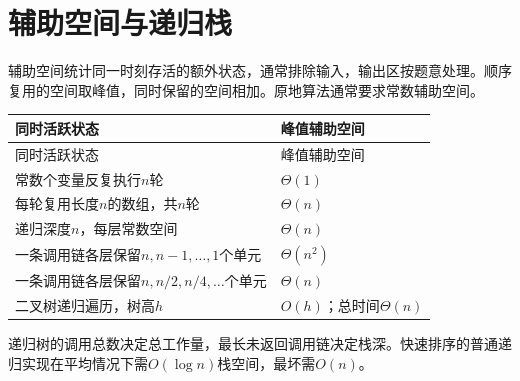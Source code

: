 \section{辅助空间与递归栈}\label{DS01-space}

辅助空间统计同一时刻存活的额外状态，通常排除输入，输出区按题意处理。顺序复用的空间取峰值，同时保留的空间相加。原地算法通常要求常数辅助空间。

\par\smallskip
{\fontsize{9.3}{12}\selectfont\setlength{\tabcolsep}{2.5pt}\setlength{\LTleft}{0pt}\setlength{\LTright}{0pt}
\begin{longtable}{@{}>{\raggedright\arraybackslash}p{}>{\raggedright\arraybackslash}p{}@{}}
\toprule
同时活跃状态 & 峰值辅助空间 \\

\midrule\endfirsthead\toprule
同时活跃状态 & 峰值辅助空间 \\

\midrule\endhead\bottomrule\endfoot
常数个变量反复执行\(n\)轮 & \(\Theta(1)\) \\

每轮复用长度\(n\)的数组，共\(n\)轮 & \(\Theta(n)\) \\

递归深度\(n\)，每层常数空间 & \(\Theta(n)\) \\

一条调用链各层保留\(n,n-1,\ldots,1\)个单元 & \(\Theta(n^2)\) \\

一条调用链各层保留\(n,n/2,n/4,\ldots\)个单元 & \(\Theta(n)\) \\

二叉树递归遍历，树高\(h\) & \(O(h)\)；总时间\(\Theta(n)\) \\

\end{longtable}}
\par\smallskip

递归树的调用总数决定总工作量，最长未返回调用链决定栈深。快速排序的普通递归实现在平均情况下需\(O(\log n)\)栈空间，最坏需\(O(n)\)。
